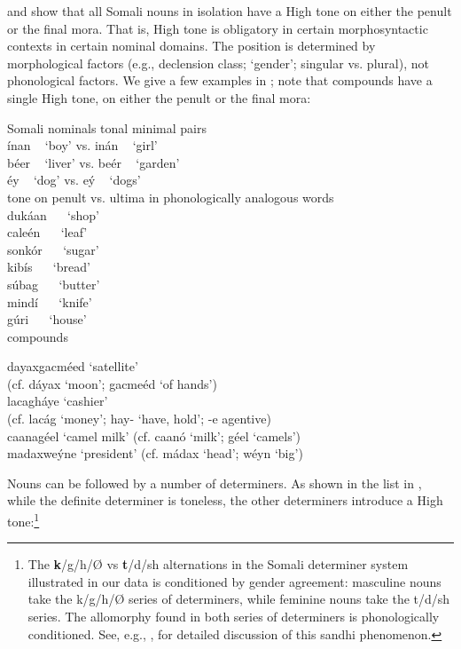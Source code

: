 \documentclass[output=paper]{langscibook}
\begin{document}
\citet{Hyman1981,Saeed1993,Saeed1999} and \citet{Green2016} show that all Somali nouns in isolation have a High tone on either the penult or the final mora. That is, High tone is obligatory in certain morphosyntactic contexts in certain nominal domains. The position is determined by morphological factors (e.g., declension class; ‘gender’; singular vs. plural), not phonological factors. We give a few examples in ; note that compounds have a single High tone, on either the penult or the final mora:
 
\ea  Somali nominals \label{ex:downing:1}
  \ea tonal minimal pairs \label{ex:downing:1a}\\
  ínan ~ \textup{‘boy’  vs.}   inán   ~ \textup{‘girl’}\\
  béer  ~ \textup{‘liver’  vs.}  beér ~ \textup{‘garden’}\\
  éy ~ \textup{‘dog’  vs.}  eý ~ \textup{‘dogs’}\\

  \ex tone on penult vs. ultima in phonologically analogous words\label{ex:downing:1b}\\

  dukáan ~~ \textup{‘shop’}\\
  caleén ~~ \textup{‘leaf’}\\
  sonkór ~~ \textup{‘sugar’}\\
  kibís ~~ \textup{‘bread’}\\
  súbag ~~ \textup{‘butter’}\\
  mindí ~~ \textup{‘knife’}\\
  gúri ~~ \textup{‘house’}\\

  \ex compounds \label{ex:downing:1c}

  dayaxgacméed \textup{‘satellite’ \\
    (cf.} dáyax \textup{‘moon’;} gacmeéd \textup{‘of hands’)}\\
  lacagháye \textup{‘cashier’ \\
    (cf.} lacág \textup{‘money’;} hay- \textup{‘have, hold’;} -e \textup{agentive)}\\
  caanagéel \textup{‘camel milk’ (cf.} caanó \textup{‘milk’;} géel \textup{‘camels’)}\\
  madaxweýne \textup{‘president’ (cf.} mádax \textup{‘head’;} wéyn \textup{‘big’)}\\
  \z
\z

Nouns can be followed by a number of determiners. As shown in the list in , while the definite determiner is toneless, the other determiners introduce a High tone:\footnote{The \textbf{k}/g/h/Ø vs \textbf{t}/d/sh alternations in the Somali determiner system illustrated in our data is conditioned by gender agreement: masculine nouns take the k/g/h/Ø series of determiners, while feminine nouns take the t/d/sh series. The allomorphy found in both series of determiners is phonologically conditioned. See, e.g., \citet{Saeed1993,Saeed1999}, for detailed discussion of this sandhi phenomenon.}
\end{document}
